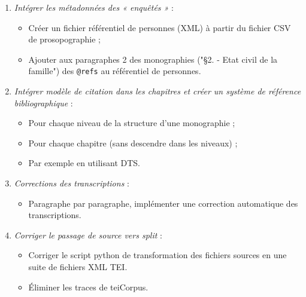 \begin{enumerate}
    \item \textit{Intégrer les métadonnées des « enquêtés »} :
    \begin{itemize}
        \item  Créer un fichier référentiel de personnes (XML) à partir du fichier CSV de prosopographie ;
        \item  Ajouter aux paragraphes 2 des monographies ("§2. - Etat civil de la famille") des \texttt{@refs} au référentiel de personnes.
    \end{itemize}

    \item \textit{Intégrer modèle de citation dans les chapitres et créer un système de référence bibliographique} :
    \begin{itemize}
        \item  Pour chaque niveau de la structure d'une monographie  ;
        \item  Pour chaque chapitre (sans descendre dans les niveaux) ;
        \item  Par exemple en utilisant DTS.
    \end{itemize}

    \item \textit{Corrections des transcriptions} :
    \begin{itemize}
        \item  Paragraphe par paragraphe, implémenter une correction automatique des transcriptions.
    \end{itemize}

    \item \textit{Corriger le passage de source vers split} :
    \begin{itemize}
        \item  Corriger le script python de transformation des fichiers sources en une suite de fichiers XML TEI.
        \item  Éliminer les traces de teiCorpus.
    \end{itemize}


\end{enumerate}
